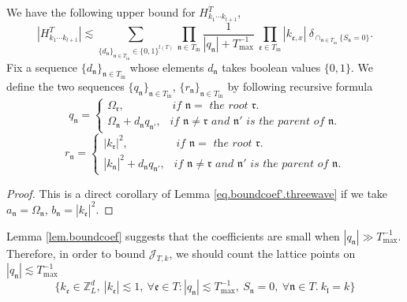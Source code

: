 \begin{lem}\label{lem.boundcoef}
We have the following upper bound for $H^T_{k_1\cdots k_{l+1}}$,
\begin{equation}\label{eq.boundcoef.threewave}
    |H^T_{k_1\cdots k_{l+1}}|\lesssim \sum_{\{d_{\mathfrak{n}}\}_{\mathfrak{n}\in T_{\text{in}}}\in\{0,1\}^{l(T)}}\prod_{\mathfrak{n}\in T_{\text{in}}}\frac{1}{|q_{\mathfrak{n}}|+T^{-1}_{\text{max}}}\ \prod_{\mathfrak{e}\in T_{\text{in}}}|k_{\mathfrak{e},x}|\ \delta_{\cap_{\mathfrak{n}\in T_{\text{in}}} \{S_{\mathfrak{n}}=0\}}.
\end{equation}
Fix a sequence $\{d_{\mathfrak{n}}\}_{\mathfrak{n}\in T_{\text{in}}}$ whose elements $d_{\mathfrak{n}}$ takes boolean values $\{0,1\}$. We define the two sequences $\{q_{\mathfrak{n}}\}_{\mathfrak{n}\in T_{\text{in}}}$, $\{r_{\mathfrak{n}}\}_{\mathfrak{n}\in T_{\text{in}}}$ by following recursive formula
\begin{equation}\label{eq.q_n.threewave}
    q_{\mathfrak{n}}=
    \begin{cases}
    \Omega_{\mathfrak{r}}, \qquad\qquad \textit{ if $\mathfrak{n}=$ the root $\mathfrak{r}$.}
    \\
    \Omega_{\mathfrak{n}}+d_{\mathfrak{n}}q_{\mathfrak{n}'},\ \ \textit{ if $\mathfrak{n}\neq\mathfrak{r}$ and $\mathfrak{n}'$ is the parent of $\mathfrak{n}$.}
    \end{cases}
\end{equation}
\begin{equation}\label{eq.r_n.threewave}
    r_{\mathfrak{n}}=
    \begin{cases}
    |k_{\mathfrak{r}}|^2, \qquad\qquad \textit{ if $\mathfrak{n}=$ the root $\mathfrak{r}$.}
    \\
    |k_{\mathfrak{n}}|^2+d_{\mathfrak{n}}q_{\mathfrak{n}'},\ \ \textit{ if $\mathfrak{n}\neq\mathfrak{r}$ and $\mathfrak{n}'$ is the parent of $\mathfrak{n}$.}
    \end{cases}
\end{equation}


\end{lem}
\begin{proof}
This is a direct corollary of Lemma \ref{eq.boundcoef'.threewave} if we take $a_{\mathfrak{n}}=\Omega_{\mathfrak{n}}$, $b_{\mathfrak{n}}=|k_{\mathfrak{e}}|^2$. 
\end{proof}


Lemma \ref{lem.boundcoef} suggests that the coefficients are small when $|q_{\mathfrak{n}}|\gg T^{-1}_{\text{max}}$. Therefore, in order to bound $\mathcal{J}_{T,k}$, we should count the lattice points on $|q_{\mathfrak{n}}|\lesssim T^{-1}_{\text{max}}$
\begin{equation}\label{eq.diophantineeq''.threewave}
    \{k_{\mathfrak{e}}\in \mathbb{Z}^d_L,\ |k_{\mathfrak{e}}|\lesssim 1,\ \forall \mathfrak{e}\in T: |q_{\mathfrak{n}}|\lesssim T^{-1}_{\text{max}},\ S_{\mathfrak{n}}=0,\ \forall \mathfrak{n}\in T.\ k_{\mathfrak{l}}=k\}
\end{equation}

